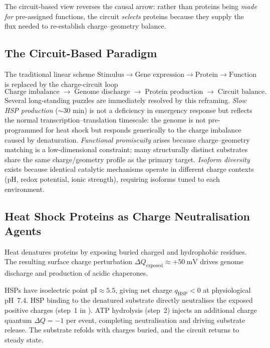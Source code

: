The circuit-based view reverses the causal arrow: rather than proteins being
\emph{made for} pre-assigned functions, the circuit \emph{selects} proteins
because they supply the flux needed to re-establish charge--geometry balance.

\subsection{The Circuit-Based Paradigm}

The traditional linear scheme $\text{Stimulus}\to\text{Gene expression}\to
\text{Protein}\to\text{Function}$ is replaced by the charge-circuit loop
\begin{equation}
    \text{Charge imbalance}
    \;\longrightarrow\;
    \text{Genome discharge}
    \;\longrightarrow\;
    \text{Protein production}
    \;\longrightarrow\;
    \text{Circuit balance}.
    \label{eq:ch03-circuit-loop}
\end{equation}
Several long-standing puzzles are immediately resolved by this reframing.
\emph{Slow HSP production} ($\sim 30$ min) is not a deficiency in emergency
response but reflects the normal transcription--translation timescale: the
genome is not pre-programmed for heat shock but responds generically to the
charge imbalance caused by denaturation.  \emph{Functional promiscuity}
arises because charge--geometry matching is a low-dimensional constraint;
many structurally distinct substrates share the same charge/geometry
profile as the primary target.  \emph{Isoform diversity} exists because
identical catalytic mechanisms operate in different charge contexts
(pH, redox potential, ionic strength), requiring isoforms tuned to each
environment.

\subsection{Heat Shock Proteins as Charge Neutralisation Agents}

Heat denatures proteins by exposing buried charged and hydrophobic residues.
The resulting surface charge perturbation $\Delta Q_{\mathrm{exposed}}\approx
+50~\mathrm{mV}$ drives genome discharge and production of acidic chaperones.

HSPs have isoelectric point $\mathrm{pI}\approx 5.5$, giving net charge
$q_{\mathrm{HSP}}<0$ at physiological pH~7.4.  HSP binding to the denatured
substrate directly neutralises the exposed positive charges (step~1 in
).  ATP hydrolysis (step~2) injects an additional
charge quantum $\Delta Q=-1$ per event, completing neutralisation and driving
substrate release.  The substrate refolds with charges buried, and the circuit
returns to steady state.

